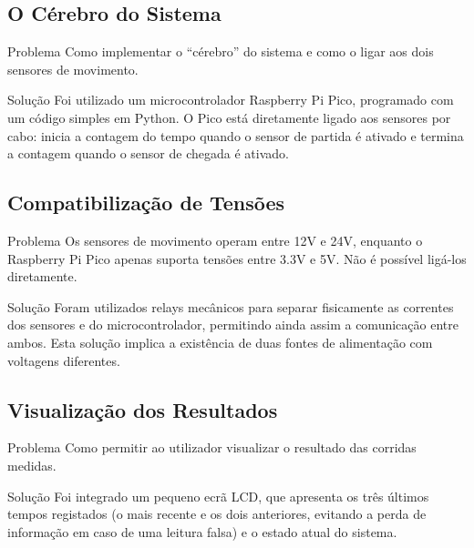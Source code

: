 \documentclass[11pt,a4paper]{article}
\begin{document}
\subsection{O Cérebro do Sistema}

\begin{probsol}{Problema}
Como implementar o ``cérebro'' do sistema e como o ligar aos dois sensores de movimento.
\end{probsol}

\begin{probsol}{Solução}
Foi utilizado um microcontrolador Raspberry Pi Pico, programado com um código simples em Python. O Pico está diretamente ligado aos sensores por cabo: inicia a contagem do tempo quando o sensor de partida é ativado e termina a contagem quando o sensor de chegada é ativado.
\end{probsol}

\subsection{Compatibilização de Tensões}

\begin{probsol}{Problema}
Os sensores de movimento operam entre 12V e 24V, enquanto o Raspberry Pi Pico apenas suporta tensões entre 3.3V e 5V. Não é possível ligá-los diretamente.
\end{probsol}

\begin{probsol}{Solução}
Foram utilizados relays mecânicos para separar fisicamente as correntes dos sensores e do microcontrolador, permitindo ainda assim a comunicação entre ambos. Esta solução implica a existência de duas fontes de alimentação com voltagens diferentes.
\end{probsol}

\subsection{Visualização dos Resultados}

\begin{probsol}{Problema}
Como permitir ao utilizador visualizar o resultado das corridas medidas.
\end{probsol}

\begin{probsol}{Solução}
Foi integrado um pequeno ecrã LCD, que apresenta os três últimos tempos registados (o mais recente e os dois anteriores, evitando a perda de informação em caso de uma leitura falsa) e o estado atual do sistema.
\end{probsol}
\end{document}
